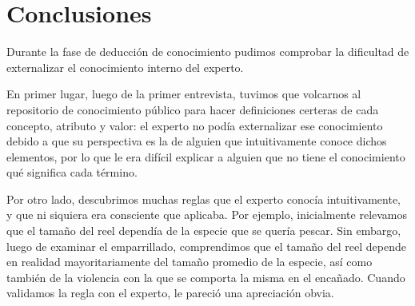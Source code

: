 \documentclass[a4paper,11pt]{article}
\begin{document}
\section{Conclusiones}

Durante la fase de deducción de conocimiento pudimos comprobar la dificultad de
externalizar el conocimiento interno del experto.

En primer lugar, luego de la primer entrevista, tuvimos que volcarnos al
repositorio de conocimiento público para hacer definiciones certeras de cada
concepto, atributo y valor: el experto no podía externalizar ese conocimiento
debido a que su perspectiva es la de alguien que intuitivamente conoce dichos
elementos, por lo que le era difícil explicar a alguien que no tiene el
conocimiento qué significa cada término.

Por otro lado, descubrimos muchas reglas que el experto conocía intuitivamente,
y que ni siquiera era consciente que aplicaba. Por ejemplo, inicialmente
relevamos que el tamaño del reel dependía de la especie que se quería pescar.
Sin embargo, luego de examinar el emparrillado, comprendimos que el tamaño del
reel depende en realidad mayoritariamente del tamaño promedio de la especie,
así como también de la violencia con la que se comporta la misma en el
encañado. Cuando validamos la regla con el experto, le pareció una apreciación
obvia.
\end{document}

